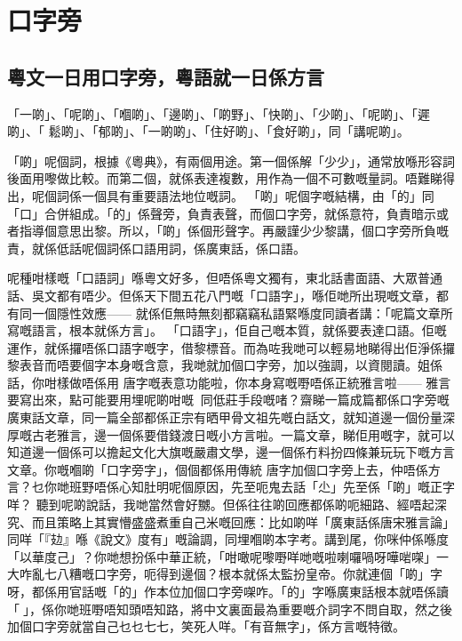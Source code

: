 \chapter{口字旁}

\section{粵文一日用口字旁，粵語就一日係方言}

「一啲」、「呢啲」、「嗰啲」、「邊啲」、「啲野」、「快啲」、「少啲」、「呢啲」、「遲啲」、「 鬆啲」、「郁啲」、「一啲啲」、「住好啲」、「食好啲」，同「講呢啲」。

「啲」呢個詞，根據《粵典》，有兩個用途。第一個係解「少少」，通常放喺形容詞後面用嚟做比較。而第二個，就係表達複數，用作為一個不可數嘅量詞。唔難睇得出，呢個詞係一個具有重要語法地位嘅詞。
「啲」呢個字嘅結構，由「的」同「口」合併組成。「的」係聲旁，負責表聲，而個口字旁，就係意符，負責暗示或者指導個意思出黎。所以，「啲」係個形聲字。再嚴謹少少黎講，個口字旁所負嘅責，就係低話呢個詞係口語用詞，係廣東話，係口語。

呢種咁樣嘅「口語詞」喺粵文好多，但唔係粵文獨有，東北話書面語、大眾普通話、吳文都有唔少。但係天下間五花八門嘅「口語字」，喺佢哋所出現嘅文章，都有同一個隱性效應—— 就係佢無時無刻都竊竊私語緊喺度同讀者講：「呢篇文章所寫嘅語言，根本就係方言」。
「口語字」，佢自己嘅本質，就係要表達口語。佢嘅運作，就係攞唔係口語字嘅字，借黎標音。而為咗我哋可以輕易地睇得出佢淨係攞黎表音而唔要個字本身嘅含意，我哋就加個口字旁，加以強調，以資閱讀。姐係話，你咁樣做唔係用 唐字嘅表意功能啦，你本身寫嘅嘢唔係正統雅言啦—— 雅言要寫出來，點可能要用埋呢啲咁嘅同低莊手段嘅啫？齋睇一篇成篇都係口字旁嘅廣東話文章，同一篇全部都係正宗有晒甲骨文祖先嘅白話文，就知道邊一個份量深厚嘅古老雅言，邊一個係要借錢渡日嘅小方言啦。一篇文章，睇佢用嘅字，就可以知道邊一個係可以擔起文化大旗嘅嚴肅文學，邊一個係冇料扮四條兼玩玩下嘅方言文章。你嘅嗰啲「口字旁字」，個個都係用傳統 唐字加個口字旁上去，仲唔係方言？乜你哋班野唔係心知肚明呢個原因，先至呃鬼去話「尐」先至係「啲」嘅正字咩？
聽到呢啲說話，我哋當然會好嬲。但係往往啲回應都係啲呃細路、經唔起深究、而且策略上其實懵盛盛煮重自己米嘅回應：比如啲咩「廣東話係唐宋雅言論」同咩「『攰』喺《說文》度有」嘅論調，同埋嗰啲本字考。講到尾，你咪仲係喺度「以華度己」？你哋想扮係中華正統，「咁噉呢嚟嘢咩哋嘅啦喇囉喎呀嘩啱㗎」一大咋亂七八糟嘅口字旁，呃得到邊個？根本就係太監扮皇帝。你就連個「啲」字呀，都係用官話嘅「的」作本位加個口字旁㗎咋。「的」字喺廣東話根本就唔係讀「󰦦」，係你哋班嘢唔知頭唔知路，將中文裏面最為重要嘅介詞字不問自取，然之後加個口字旁就當自己乜乜七七，笑死人咩。「有音無字」，係方言嘅特徵。

